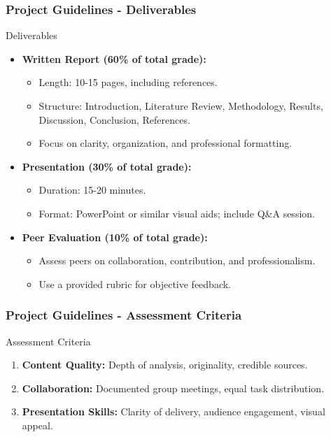 \documentclass[aspectratio=169]{beamer}
\begin{document}
\begin{frame}[fragile]
    \frametitle{Project Guidelines - Deliverables}
    \begin{block}{Deliverables}
        \begin{itemize}
            \item \textbf{Written Report (60\% of total grade):}
                \begin{itemize}
                    \item Length: 10-15 pages, including references.
                    \item Structure: Introduction, Literature Review, Methodology, Results, Discussion, Conclusion, References.
                    \item Focus on clarity, organization, and professional formatting.
                \end{itemize}
            \item \textbf{Presentation (30\% of total grade):}
                \begin{itemize}
                    \item Duration: 15-20 minutes.
                    \item Format: PowerPoint or similar visual aids; include Q\&A session.
                \end{itemize}
            \item \textbf{Peer Evaluation (10\% of total grade):}
                \begin{itemize}
                    \item Assess peers on collaboration, contribution, and professionalism.
                    \item Use a provided rubric for objective feedback.
                \end{itemize}
        \end{itemize}
    \end{block}
\end{frame}

\begin{frame}[fragile]
    \frametitle{Project Guidelines - Assessment Criteria}
    \begin{block}{Assessment Criteria}
        \begin{enumerate}
            \item \textbf{Content Quality:} Depth of analysis, originality, credible sources.
            \item \textbf{Collaboration:} Documented group meetings, equal task distribution.
            \item \textbf{Presentation Skills:} Clarity of delivery, audience engagement, visual appeal.
        \end{enumerate}
    \end{block}
\end{frame}
\end{document}
